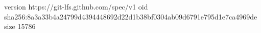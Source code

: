 version https://git-lfs.github.com/spec/v1
oid sha256:8a3a33b4a24799d4394448692d22d1b38bf0304ab09d6791e795d1e7ca4969de
size 15786
